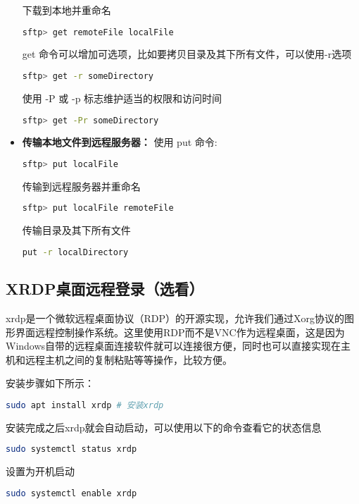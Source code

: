 \documentclass[lang=cn,a4paper,newtx]{elegantpaper}
\begin{document}
\begin{itemize}
  下载到本地并重命名
  \begin{lstlisting}[language=bash]
sftp> get remoteFile localFile
  \end{lstlisting}

get 命令可以增加可选项，比如要拷贝目录及其下所有文件，可以使用-r选项
  \begin{lstlisting}[language=bash]
sftp> get -r someDirectory
  \end{lstlisting}

使用 -P 或 -p 标志维护适当的权限和访问时间
  \begin{lstlisting}[language=bash]
sftp> get -Pr someDirectory
  \end{lstlisting}

  \item \textbf{传输本地文件到远程服务器：}
使用 put 命令:  
  \begin{lstlisting}[language=bash]
sftp> put localFile
  \end{lstlisting}

  传输到远程服务器并重命名
  \begin{lstlisting}[language=bash]
sftp> put localFile remoteFile
  \end{lstlisting}

  传输目录及其下所有文件
  \begin{lstlisting}[language=bash]
put -r localDirectory
  \end{lstlisting}
\end{itemize}

\subsection{XRDP桌面远程登录（选看）}
xrdp是一个微软远程桌面协议（RDP）的开源实现，允许我们通过Xorg协议的图形界面远程控制操作系统。这里使用RDP而不是VNC作为远程桌面，这是因为Windows自带的远程桌面连接软件就可以连接很方便，同时也可以直接实现在主机和远程主机之间的复制粘贴等等操作，比较方便。

安装步骤如下所示：
\begin{lstlisting}[language=bash]
sudo apt install xrdp # 安装xrdp
\end{lstlisting}

安装完成之后xrdp就会自动启动，可以使用以下的命令查看它的状态信息
\begin{lstlisting}[language=bash]
sudo systemctl status xrdp
\end{lstlisting}

设置为开机启动
\begin{lstlisting}[language=bash]
sudo systemctl enable xrdp
\end{lstlisting}
\end{document}
